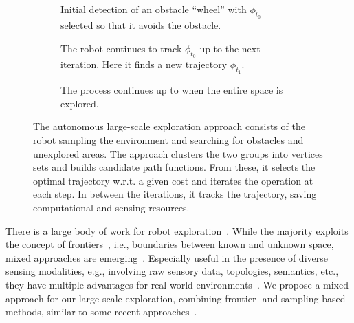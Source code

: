 \documentclass[lettersize,journal]{IEEEtran}
\theoremstyle{definition}
\begin{document}
\begin{figure*}
  \begin{subfigure}[m]{0.33\textwidth}
    \centering
    
    \caption{Initial detection of an obstacle ``wheel'' with $\phi_{t_0}$ selected so that it avoids the obstacle.}
    \label{fig:3-1}
  \end{subfigure}
  \hfill
  \begin{subfigure}[m]{0.32\textwidth}
    \centering
    \hspace*{-.15cm}
    
    \caption{The robot continues to track $\phi_{t_0}$ up to the next iteration. Here it finds a new trajectory $\phi_{t_1}$.}
    \label{fig:3-2}
  \end{subfigure}
  \begin{subfigure}[m]{0.33\textwidth}
    \centering
    \hspace*{.05cm}
    
    \caption{The process continues up to when the entire space is explored.}
    \label{fig:3-3}
  \end{subfigure}
  \caption{The autonomous large-scale exploration %
  approach consists of the robot sampling the environment and searching for obstacles and unexplored areas. The %
  approach clusters the two groups into vertices sets and builds candidate path functions. From these, it selects the optimal trajectory w.r.t. a given cost and iterates the operation at each step. In between the iterations, it tracks the trajectory, saving computational and sensing resources.}
  \label{fig:3}
\end{figure*}

There is a large body of work for robot exploration~\cite{lavalle2006planning,yamauchi1997frontier,placed2022survey,dang2019graph,julia2012comparison}. 
While the majority exploits the concept of frontiers~\cite{wenchuan2019sampling}, i.e., boundaries between known and unknown space, mixed approaches are emerging~\cite{dai2020fast,schmid2020efficient,placed2022survey}. 
Especially useful in the presence of diverse sensing modalities, e.g., involving raw sensory data, topologies, semantics, etc., they have multiple %
advantages for real-world environments~\cite{placed2022survey,batinovic2021multi}. 
%
We propose a %
mixed approach for our large-scale exploration, %
combining frontier- and sampling-based methods, similar to some recent approaches~\cite{dai2020fast,wenchuan2019sampling,shrestha2019learned}. %
\end{document}
